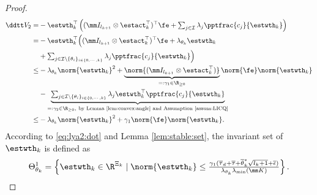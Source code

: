 \documentclass[letterpaper, journal]{IEEEtran}
\providecommand{\DIFaddbegin}{} %
\providecommand{\DIFaddend}{} %
\providecommand{\DIFdelend}{} %
\begin{document}
\begin{proof}
\begin{equation}
\DIFdelend \DIFaddbegin \begin{aligned}
        \ddtt V_2 
        =& 
        -\estwth_k^\top 
        \left(
            (\mm I_{l_{k+1}}\otimes \estact_k^\top)^\top
            \fe
            +
            \textstyle\sum_{j\in\mathcal{I}}
            \lambda_j 
            \pptfrac{c_j}{\estwth_k}
        \right)
        \\
        =&
        -\estwth_k^\top 
        \Big(
            (\mm I_{l_{k+1}}\otimes \estact_k^\top)^\top
            \fe
            +
            \lambda_{\theta_k}\estwth_k
        \\
        &
            +
            \textstyle\sum_{
                j\in\mathcal{I}\setminus \{\theta_i\}_{i\in\{0,\cdots,k\}}
            }
            \lambda_j 
            \pptfrac{c_j}{\estwth_k}
        \Big)
        \\
        \le&
        -
        \lambda_{\theta_k}\norm{\estwth_k}^2
        +
        \underbrace{
            \norm{(\mm I_{l_{k+1}}\otimes {\estact}_k^\top)}
        }_{=:{\gamma}_1\in\R_{\ge0}}
        \norm{\fe}
        \norm{\estwth_k}
        \\
        &
        -
        \underbrace{
            \textstyle\sum_{
                j\in\mathcal{I}\setminus \{\theta_i\}_{i\in\{0,\cdots,k\}}
            }
            \lambda_j 
            \estwth_k^\top \pptfrac{c_j}{\estwth_k}
        }_{=:{\gamma}_2\in\R_{\ge0},\ \text{by Lemma \ref{lem:convex:angle} and Assumption \ref{assum:LICQ}}}
        \\
        \le&
        -
        \lambda_{\theta_k}\norm{\estwth_k}^2
        +
        {\gamma}_1     
        \norm{\fe}
        \norm{\estwth_k}
        .
    \end{aligned}\DIFaddend 
    \label{eq:lya2:dot}
\end{equation}
According to \eqref{eq:lya2:dot} and Lemma \ref{lem:stable:set}, the invariant set of $\estwth_k$ is defined as
\begin{equation}
    \Theta_{\theta_k}^{1} 
    = 
    \left\{ 
        \estwth_k \in \R^{\Xi_{k}} 
        \mid 
        \norm{\estwth_k} 
        \le 
        \tfrac{
            {\gamma}_1
            (
                \overline\tau_d
                +
                \overline\tau
                +
                \overline{\theta}^*_k\sqrt{l_{k}+1}
                +
                \overline{\epsilon}
            )
        }{
            \lambda_{\theta_k}\lambda_{\min}(\mm K)
        }
    \right\}
    .
    \label{eq:invariant:c1:wth}
\end{equation}


\end{proof}
\end{document}
